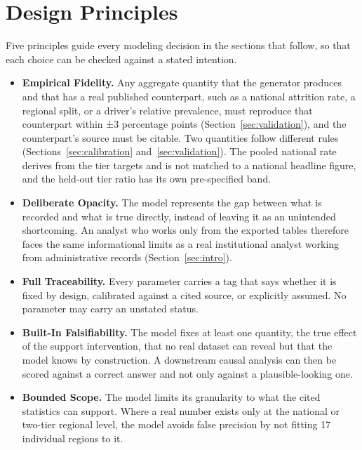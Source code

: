 \documentclass[11pt]{article}
\begin{document}
\FloatBarrier
\section{Design Principles}
\label{sec:principles}

\hspace*{\parindent}Five principles guide every modeling decision in the sections that follow, so that each choice can be checked against a stated intention.

\begin{itemize}[topsep=2pt,itemsep=3pt,parsep=0pt]
\item \textbf{Empirical Fidelity.} Any aggregate quantity that the generator produces and that has a real published counterpart, such as a national attrition rate, a regional split, or a driver's relative prevalence, must reproduce that counterpart within ±3 percentage points (Section~\ref{sec:validation}), and the counterpart's source must be citable. Two quantities follow different rules (Sections~\ref{sec:calibration} and~\ref{sec:validation}). The pooled national rate derives from the tier targets and is not matched to a national headline figure, and the held-out tier ratio has its own pre-specified band.
\item \textbf{Deliberate Opacity.} The model represents the gap between what is recorded and what is true directly, instead of leaving it as an unintended shortcoming. An analyst who works only from the exported tables therefore faces the same informational limits as a real institutional analyst working from administrative records (Section~\ref{sec:intro}).
\item \textbf{Full Traceability.} Every parameter carries a tag that says whether it is fixed by design, calibrated against a cited source, or explicitly assumed. No parameter may carry an unstated status.
\item \textbf{Built-In Falsifiability.} The model fixes at least one quantity, the true effect of the support intervention, that no real dataset can reveal but that the model knows by construction. A downstream causal analysis can then be scored against a correct answer and not only against a plausible-looking one.
\item \textbf{Bounded Scope.} The model limits its granularity to what the cited statistics can support. Where a real number exists only at the national or two-tier regional level, the model avoids false precision by not fitting 17 individual regions to it.
\end{itemize}
\end{document}
